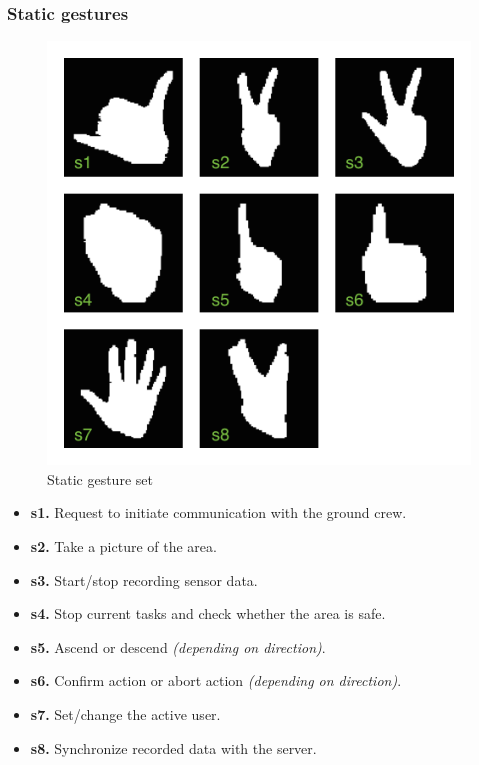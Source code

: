 \documentclass[a4paper,11pt,oneside]{article}
\begin{document}
  \subsubsection{Static gestures}

\begin{figure}[H]
\centering
\includegraphics[scale=0.6]{static-gestureset.png}
\caption{Static gesture set}
\end{figure}
  
  \begin{itemize}
  \item \textbf{s1.} Request to initiate communication with the ground crew.
  \item \textbf{s2.} Take a picture of the area.
  \item \textbf{s3.} Start/stop recording sensor data.
  \item \textbf{s4.} Stop current tasks and check whether the area is safe.
  \item \textbf{s5.} Ascend or descend \textit{(depending on direction)}.
  \item \textbf{s6.} Confirm action or abort action \textit{(depending on direction)}.
  \item \textbf{s7.} Set/change the active user.
  \item \textbf{s8.} Synchronize recorded data with the server.
  \end{itemize}
  
\end{document}
